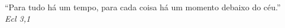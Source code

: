 \begin{titlepage}
 \vspace*{5cm}
 \begin{flushright}
  ``Para tudo há um tempo, para cada coisa há um momento debaixo do céu.''\\\textit{Ecl 3,1}
  \vspace{1cm}
 \end{flushright}
\end{titlepage}
